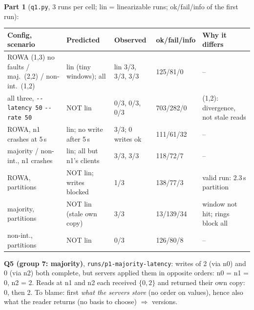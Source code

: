 \documentclass[a4paper,10pt]{article}
\newcommand{\opt}[1]{\texttt{-{}-#1}}
\newcommand{\run}[1]{\texttt{runs/#1}}
\begin{document}
\vspace{-0.4em}
\noindent\textbf{Part 1} (\texttt{q1.py}, 3 runs per cell; lin = linearizable runs; ok/fail/info of the first run):
\vspace{-0.3em}
\begin{center}\footnotesize
\begin{tabular}{@{}p{5.0cm}p{3.2cm}p{1.9cm}p{1.6cm}p{3.2cm}@{}}
\toprule
Config, scenario & Predicted & Observed & ok/fail/info & Why it differs \\
\midrule
ROWA (1,3) no faults / maj.\ (2,2) / non-int.\ (1,2) & lin (tiny windows); all & lin 3/3, 3/3, 3/3 & 125/81/0 & -- \\
all three, \opt{latency 50} \opt{rate 50} & NOT lin & 0/3, 0/3, 0/3 & 703/282/0 & (1,2): divergence, not stale reads \\
ROWA, n1 crashes at 5\,s & lin; no write after 5\,s & 3/3; 0 writes ok & 111/61/32 & -- \\
majority / non-int., n1 crashes & lin; all but n1's clients & 3/3, 3/3 & 118/72/7 & -- \\
ROWA, partitions & NOT lin; writes blocked & 1/3 & 138/77/3 & valid run: 2.3\,s partition \\
majority, partitions & NOT lin (stale own copy) & 3/3 & 13/139/34 & window not hit; rings block all \\
non-int., partitions & NOT lin & 0/3 & 126/80/8 & -- \\
\bottomrule
\end{tabular}
\end{center}
\vspace{-0.4em}
\noindent\textbf{Q5 (group 7: majority)}, \run{p1-majority-latency}: writes
of 2 (via n0) and 0 (via n2) both complete, but servers applied them in
opposite orders: n0 = n1 = 0, n2 = 2. Reads at n1 and n2 each received
$\{0,2\}$ and returned their own copy: 0, then 2. To blame: first
\emph{what the servers store} (no order on values), hence also what the
reader returns (no basis to choose) $\Rightarrow$ versions.\par\vspace{0.5em}
\end{document}
